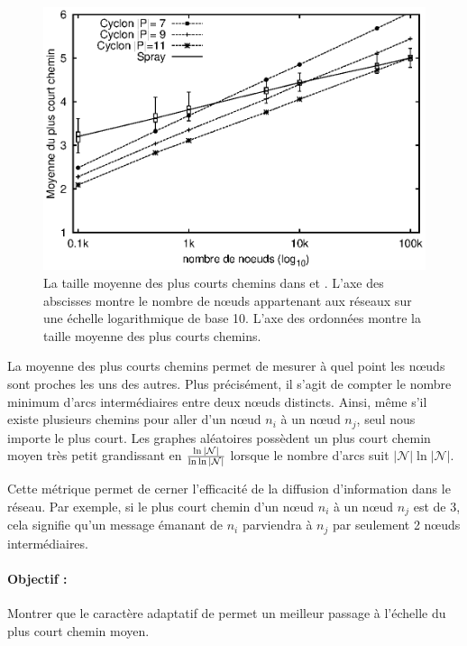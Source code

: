 \begin{figure}
  \centering
  \includegraphics[width=.8\textwidth]{img/spray/avgpath.eps}
  \caption[Plus courts chemins moyens]{\label{net:fig:shortestpath} La taille
    moyenne des plus courts chemins dans \SPRAY et \CYCLON. L'axe des abscisses
    montre le nombre de nœuds appartenant aux réseaux sur une échelle
    logarithmique de base 10. L'axe des ordonnées montre la taille moyenne des
    plus courts chemins.}
\end{figure}

La moyenne des plus courts chemins permet de mesurer à quel point les nœuds sont
proches les uns des autres. Plus précisément, il s'agit de compter le nombre
minimum d'arcs intermédiaires entre deux nœuds distincts. Ainsi, même s'il
existe plusieurs chemins pour aller d'un nœud $n_i$ à un nœud $n_j$, seul nous
importe le plus court.  Les graphes aléatoires possèdent un plus court chemin
moyen très petit grandissant en $\ln|\mathcal{N}|\over\ln\ln|\mathcal{N}|$
lorsque le nombre d'arcs suit $|\mathcal{N}|\ln|\mathcal{N}|$.

Cette métrique permet de cerner l'efficacité de la diffusion d'information dans
le réseau. Par exemple, si le plus court chemin d'un nœud $n_i$ à un nœud $n_j$
est de 3, cela signifie qu'un message émanant de $n_i$ parviendra à $n_j$ par
seulement 2 nœuds intermédiaires.

\paragraph{Objectif :} Montrer que le caractère adaptatif de \SPRAY permet un
meilleur passage à l'échelle du plus court chemin moyen.

